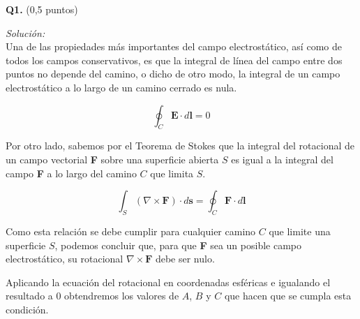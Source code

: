 \textbf{Q1.} (0,5 puntos)


\vspace{20px}
\textit{Solución:}
\\

Una de las propiedades más importantes del campo electrostático, así como de todos los campos conservativos,
es que la integral de línea del campo entre dos puntos no depende del camino, o dicho de otro modo, la
integral de un campo electrostático a lo largo de un camino cerrado es nula.

\begin{equation*}
    \oint_{C} \textbf{E} \cdot d\textbf{l} = 0
\end{equation*}

Por otro lado, sabemos por el Teorema de Stokes que la integral del rotacional de un campo vectorial \textbf{F}
sobre una superficie abierta
$S$ es igual a la integral del campo \textbf{F} a lo largo del camino $C$ que limita $S$.

\begin{equation*}
    \int_{S} (\nabla \times \textbf{F}) \cdot d\textbf{s} = \oint_{C} \textbf{F} \cdot d\textbf{l}
\end{equation*}

Como esta relación se debe cumplir para cualquier camino $C$ que limite una superficie $S$, podemos concluir que, para que
\textbf{F} sea un posible campo electrostático, su
rotacional $\nabla \times \textbf{F}$ debe ser nulo.

Aplicando la ecuación del rotacional en coordenadas esféricas e igualando el resultado a 0 obtendremos los valores de
$A$, $B$ y $C$ que hacen que se cumpla esta condición.

\renewcommand{\arraystretch}{1.2}

